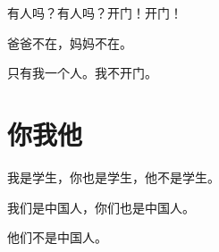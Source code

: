 \documentclass[12pt,UTF-8,openany]{ctexbook}
\begin{document}
\begin{large}
    
    有人吗？有人吗？开门！开门！
    
    爸爸不在，妈妈不在。
    
    只有我一个人。我不开门。
    
\end{large}


\clearpage

\begin{center}
    
\end{center}


\hanzibox{}\hanzibox{}\hanzibox{}\hanzibox{}\hspace{1em}\hanzibox{}\hanzibox{}\hanzibox{}\hanzibox{}

\hanzibox{}\hanzibox{}\hanzibox{}\hanzibox{}\hspace{1em}\hanzibox{}\hanzibox{}\hanzibox{}\hanzibox{}

\hanzibox{}\hanzibox{}\hanzibox{}\hanzibox{}\hspace{1em}\hanzibox{}\hanzibox{}\hanzibox{}\hanzibox{}

\hanzibox{}\hanzibox{}\hanzibox{}\hanzibox{}\hspace{1em}




\chapter{你我他}

\begin{large}
    
    我是学生，你也是学生，他不是学生。
    
    我们是中国人，你们也是中国人。
    
    他们不是中国人。
    
\end{large}


\clearpage

\begin{center}
    
\end{center}


\hanzibox{}\hanzibox{}\hanzibox{}\hanzibox{}\hspace{1em}\hanzibox{}\hanzibox{}\hanzibox{}\hanzibox{}
\end{document}
